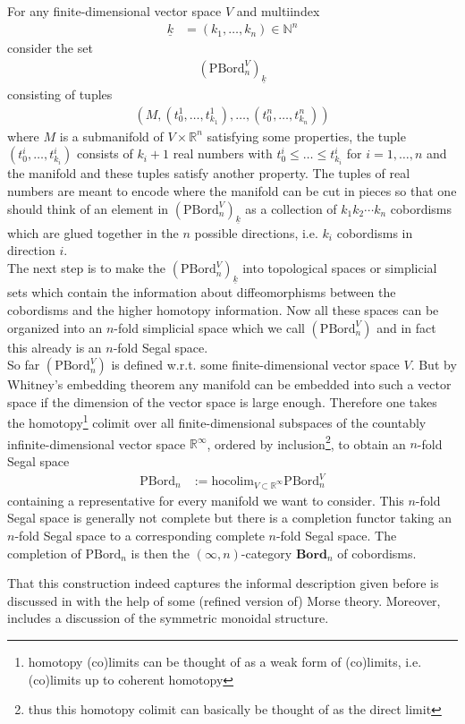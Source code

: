 \begin{cst}[Sketch]
\label{cst:bordn}
For any finite-dimensional vector space $V$ and multiindex
\begin{align*}
  \underline{k}
  &=
  (k_{1},\ldots,k_{n})
  \in
  \mathbb{N}^{n}
\end{align*}
consider the set
\begin{align*}
  \left(
    \mathrm{PBord}_{n}^{V}
  \right)_{\underline{k}}
\end{align*}
consisting of tuples
\begin{align*}
  \left(
    M
    ,
    \left(
      t_{0}^{1}
      ,
      \ldots
      ,
      t_{k_{1}}^{1}
    \right)
    ,
    \ldots
    ,
    \left(
      t_{0}^{n}
      ,
      \ldots
      ,
      t_{k_{n}}^{n}
    \right)
  \right)
\end{align*}
where $M$ is a submanifold of $V \times \mathbb{R}^{n}$ satisfying some properties, the tuple $(t_{0}^{i},\ldots,t_{k_{i}}^{i})$ consists of $k_{i}+1$ real numbers with $t_{0}^{i} \leq \ldots \leq t_{k_{i}}^{i}$ for $i = 1,\ldots,n$ and the manifold and these tuples satisfy another property. The tuples of real numbers are meant to encode where the manifold can be cut in pieces so that one should think of an element in $(\mathrm{PBord}_{n}^{V})_{\underline{k}}$ as a collection of $k_{1} k_{2} \cdots k_{n}$ cobordisms which are glued together in the $n$ possible directions, i.e. $k_{i}$ cobordisms in direction $i$.
\\
The next step is to make the $(\mathrm{PBord}_{n}^{V})_{\underline{k}}$ into topological spaces or simplicial sets which contain the information about diffeomorphisms between the cobordisms and the higher homotopy information. Now all these spaces can be organized into an $n$-fold simplicial space which we call $(\mathrm{PBord}_{n}^{V})$ and in fact this already is an $n$-fold Segal space.
\\
So far $(\mathrm{PBord}_{n}^{V})$ is defined w.r.t. some finite-dimensional vector space $V$. But by Whitney's embedding theorem any manifold can be embedded into such a vector space if the dimension of the vector space is large enough. Therefore one takes the homotopy\footnote{homotopy (co)limits can be thought of as a weak form of (co)limits, i.e. (co)limits up to coherent homotopy} colimit over all finite-dimensional subspaces of the countably infinite-dimensional vector space $\mathbb{R}^{\infty}$, ordered by inclusion\footnote{thus this homotopy colimit can basically be thought of as the direct limit}, to obtain an $n$-fold Segal space
\begin{align*}
  \mathrm{PBord}_{n}
  &:=
  \mathrm{hocolim}_{V \subset \mathbb{R}^{\infty}}
  \mathrm{PBord}_{n}^{V}
\end{align*}
containing a representative for every manifold we want to consider. This $n$-fold Segal space is generally not complete but there is a completion functor taking an $n$-fold Segal space to a corresponding complete $n$-fold Segal space. The completion of $\mathrm{PBord}_{n}$ is then the $(\infty,n)$-category $\mathbf{Bord}_{n}$ of cobordisms.
\end{cst}
That this construction indeed captures the informal description given before is discussed in \cite{29781dd2} with the help of some (refined version of) Morse theory. Moreover, \cite{29781dd2} includes a discussion of the symmetric monoidal structure.

